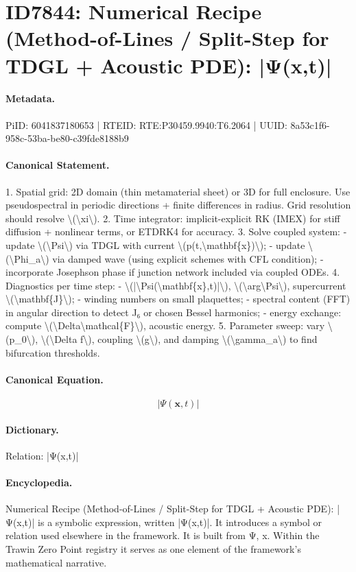 \section*{ID7844: Numerical Recipe (Method-of-Lines / Split-Step for TDGL + Acoustic PDE): |Ψ(x,t)|}
\paragraph{Metadata.}
PiID: 6041837180653 | RTEID: RTE:P30459.9940:T6.2064 | UUID: 8a53c1f6-958c-53ba-be80-c39fde8188b9

\paragraph{Canonical Statement.}
1. Spatial grid: 2D domain (thin metamaterial sheet) or 3D for full enclosure. Use pseudospectral in periodic directions + finite differences in radius. Grid resolution should resolve \textbackslash{}(\textbackslash{}xi\textbackslash{}). 2. Time integrator: implicit-explicit RK (IMEX) for stiff diffusion + nonlinear terms, or ETDRK4 for accuracy. 3. Solve coupled system: - update \textbackslash{}(\textbackslash{}Psi\textbackslash{}) via TDGL with current \textbackslash{}(p(t,\textbackslash{}mathbf\{x\})\textbackslash{}); - update \textbackslash{}(\textbackslash{}Phi\_a\textbackslash{}) via damped wave (using explicit schemes with CFL condition); - incorporate Josephson phase if junction network included via coupled ODEs. 4. Diagnostics per time step: - \textbackslash{}(|\textbackslash{}Psi(\textbackslash{}mathbf\{x\},t)|\textbackslash{}), \textbackslash{}(\textbackslash{}arg\textbackslash{}Psi\textbackslash{}), supercurrent \textbackslash{}(\textbackslash{}mathbf\{J\}\textbackslash{}); - winding numbers on small plaquettes; - spectral content (FFT) in angular direction to detect J₆ or chosen Bessel harmonics; - energy exchange: compute \textbackslash{}(\textbackslash{}Delta\textbackslash{}mathcal\{F\}\textbackslash{}), acoustic energy. 5. Parameter sweep: vary \textbackslash{}(p\_0\textbackslash{}), \textbackslash{}(\textbackslash{}Delta f\textbackslash{}), coupling \textbackslash{}(g\textbackslash{}), and damping \textbackslash{}(\textbackslash{}gamma\_a\textbackslash{}) to find bifurcation thresholds.

\paragraph{Canonical Equation.}
\[
|\Psi(\mathbf{x},t)|
\]

\paragraph{Dictionary.}
Relation: |Ψ(x,t)|

\paragraph{Encyclopedia.}
Numerical Recipe (Method-of-Lines / Split-Step for TDGL + Acoustic PDE): |Ψ(x,t)| is a symbolic expression, written |Ψ(x,t)|. It introduces a symbol or relation used elsewhere in the framework. It is built from Ψ, x. Within the Trawin Zero Point registry it serves as one element of the framework's mathematical narrative.
